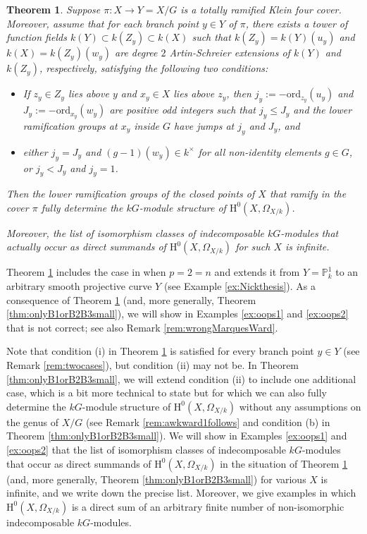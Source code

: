 \documentclass{amsart}
\numberwithin{equation}{section}
\numberwithin{table}{section}
\theoremstyle{plain}
\newtheorem{theorem}{Theorem}[section]
\theoremstyle{definition}
\theoremstyle{remark}
\newcommand{\HH}{\mathrm{H}}
\begin{document}
\begin{theorem}
\label{thm:awkward1}
Suppose $\pi:X\to Y=X/G$ is a totally ramified Klein four cover. 
Moreover, assume that for each branch point $y\in Y$ of $\pi$, there exists a tower of function fields $k(Y)\subset k(Z_y) \subset k(X)$ such that $k(Z_y) = k(Y)(u_y)$ and $k(X)=k(Z_y)(w_y)$ are degree $2$ Artin-Schreier extensions of $k(Y)$ and $k(Z_y)$, respectively, satisfying the following two conditions:
\begin{itemize}
\item[(i)] If $z_y\in Z_y$ lies above $y$ and $x_y\in X$ lies above $z_y$, then $j_y:=-\mathrm{ord}_{z_y}(u_y)$ and $J_y:=-\mathrm{ord}_{x_y}(w_y)$ are positive odd integers such that $j_y\le J_y$ and the lower ramification groups at $x_y$ inside $G$ have jumps at $j_y$ and $J_y$, and
\item[(ii)] either $j_y=J_y$ and $(g-1)(w_y)\in k^\times$ for all non-identity elements $g \in G$, or $j_y<J_y$ and $j_y=1$.
\end{itemize}
Then the lower ramification groups of the closed points of $X$ that ramify in the cover $\pi$ 
fully determine the $kG$-module structure of $\HH^0(X,\Omega_{X/k})$. 

Moreover, the list of isomorphism classes of  indecomposable $kG$-modules that actually occur as direct summands of $\HH^0(X,\Omega_{X/k})$ for such $X$ is infinite.
\end{theorem}

Theorem \ref{thm:awkward1} includes the case in \cite{RzedowskiCVillaSMadan1996} when $p=2=n$ and extends it from $Y=\mathbb{P}^1_k$ to an arbitrary smooth projective curve $Y$ (see Example \ref{ex:Nickthesis}). As a consequence of Theorem \ref{thm:awkward1} (and, more generally, Theorem \ref{thm:onlyB1orB2B3small}), we will show in Examples \ref{ex:oops1} and \ref{ex:oops2} that \cite[Theorem 6.4]{MarquesWard2018} is not correct; see also Remark \ref{rem:wrongMarquesWard}.

Note that condition (i) in Theorem \ref{thm:awkward1} is satisfied for every branch point $y\in Y$ (see Remark \ref{rem:twocases}), but condition (ii) may not be. In Theorem \ref{thm:onlyB1orB2B3small}, we will extend condition (ii) to include one additional case, which is a bit more technical to state but for which we can also fully determine the $kG$-module structure of $\HH^0(X,\Omega_{X/k})$ without any assumptions on the genus of $X/G$ (see Remark \ref{rem:awkward1follows} and condition (b) in Theorem \ref{thm:onlyB1orB2B3small}). We will show in Examples \ref{ex:oops1} and \ref{ex:oops2}  that the list of isomorphism classes of  indecomposable $kG$-modules that occur as direct summands of $\HH^0(X,\Omega_{X/k})$ in the situation of Theorem \ref{thm:awkward1} (and, more generally, Theorem \ref{thm:onlyB1orB2B3small}) for various $X$ is infinite, and we write down the precise list. Moreover, we give examples in which $\HH^0(X,\Omega_{X/k})$ is a direct sum of an arbitrary finite number of non-isomorphic indecomposable $kG$-modules. 
\end{document}
